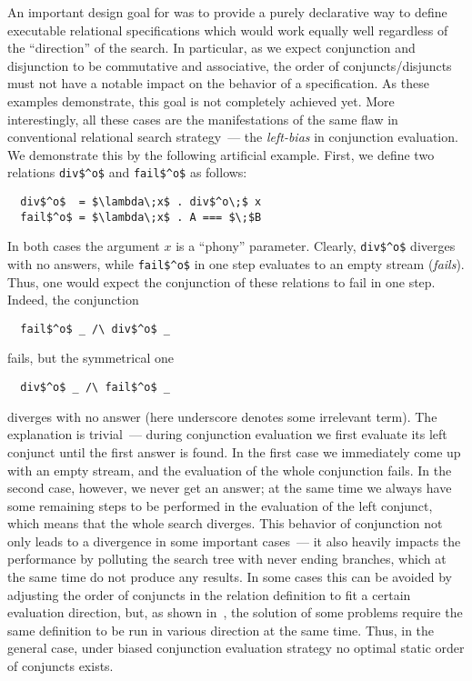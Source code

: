 An important design goal for \mk was to provide a purely declarative way to define executable relational specifications which would work equally well regardless of the ``direction'' of the search.
In particular, as we expect conjunction and disjunction to be commutative and associative, the order of conjuncts/disjuncts must not have a notable impact on the behavior of
a specification. As these examples demonstrate, this goal is not completely achieved yet. More interestingly, all these cases are the manifestations of the same flaw in conventional
relational search strategy~--- the \emph{left-bias} in conjunction evaluation. We demonstrate this by the following artificial example. First, we define two relations \lstinline{div$^o$} and
\lstinline|fail$^o$| as follows:

\begin{lstlisting}
  div$^o$  = $\lambda\;x$ . div$^o\;$ x
  fail$^o$ = $\lambda\;x$ . A === $\;$B
\end{lstlisting}

In both cases the argument $x$ is a ``phony'' parameter. Clearly, \lstinline|div$^o$| diverges with no answers, while \lstinline|fail$^o$| in one step evaluates to an empty stream (\emph{fails}). Thus,
one would expect the conjunction of these relations to fail in one step. Indeed, the conjunction

\begin{lstlisting}
  fail$^o$ _ /\ div$^o$ _
\end{lstlisting}

fails, but the symmetrical one

\begin{lstlisting}
  div$^o$ _ /\ fail$^o$ _ 
\end{lstlisting}

diverges with no answer (here underscore denotes some irrelevant term). The explanation is trivial~--- during conjunction evaluation we first evaluate its left conjunct
until the first answer is found. In the first case we immediately come up with an empty stream, and the evaluation of the whole conjunction fails. In the second case,
however, we never get an answer; at the same time we always have some remaining steps to be performed in the evaluation of the left conjunct, which means that the
whole search diverges. This behavior of conjunction not only leads to a divergence in some important cases~--- it also heavily impacts the performance by polluting
the search tree with never ending branches, which at the same time do not produce any results. In some cases this can be avoided by adjusting the order of conjuncts in
the relation definition to fit a certain evaluation direction, but, as shown in~\cite{fair:DivTest}, the solution of some problems require the same definition to be run in
various direction at the same time. Thus, in the general case, under biased conjunction evaluation strategy no optimal static order of conjuncts exists.


